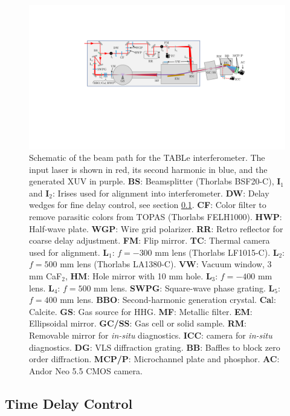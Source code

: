 \begin{figure}
	\centering
	\includegraphics[width=1.0\textwidth]{figures/Beamline/beampath_sketch_3.pdf}
	\caption[Schematic of TABLe optical layout.]{Schematic of the beam path for the TABLe interferometer. The input laser is shown in red, its second harmonic in  blue, and the generated XUV in purple.  \textbf{BS}: Beamsplitter (Thorlabs BSF20-C), \textbf{I$_1$} and \textbf{I$_2$}: Irises used for alignment into interferometer. \textbf{DW}: Delay wedges for fine delay control, see section \ref{sec:delay_wedges}. \textbf{CF}: Color filter to remove parasitic colors from TOPAS (Thorlabs FELH1000). \textbf{HWP}: Half-wave plate. \textbf{WGP}: Wire grid polarizer. \textbf{RR}: Retro reflector for coarse delay adjustment.  \textbf{FM}: Flip mirror. \textbf{TC}: Thermal camera used for alignment.  \textbf{L$_1$}: $f=-300$ mm lens (Thorlabs LF1015-C). \textbf{L$_2$}: $f=500$ mm lens (Thorlabs LA1380-C). \textbf{VW}: Vacuum window, 3 mm CaF$_2$, \textbf{HM}: Hole mirror with 10 mm hole.  \textbf{L$_3$}: $f=-400$ mm lens.  \textbf{L$_4$}: $f=500$ mm lens. \textbf{SWPG}: Square-wave phase grating. \textbf{L$_5$}: $f=400$ mm lens.  \textbf{BBO}: Second-harmonic generation crystal.  \textbf{Ca}l: Calcite. \textbf{GS}: Gas source for HHG. \textbf{MF}: Metallic filter. \textbf{EM}: Ellipsoidal mirror. \textbf{GC/SS}: Gas cell or solid sample. \textbf{RM}: Removable mirror for \textit{in-situ} diagnostics.    \textbf{ICC}: camera for \textit{in-situ} diagnostics. \textbf{DG}: VLS diffraction grating. \textbf{BB}: Baffles to block zero order diffraction.  \textbf{MCP/P}: Microchannel plate and phosphor.  \textbf{AC}: Andor Neo 5.5 CMOS camera.}
	\label{fig:beampath_sketch}
\end{figure}


\subsection{Time Delay Control}
\label{sec:delay_wedges}

